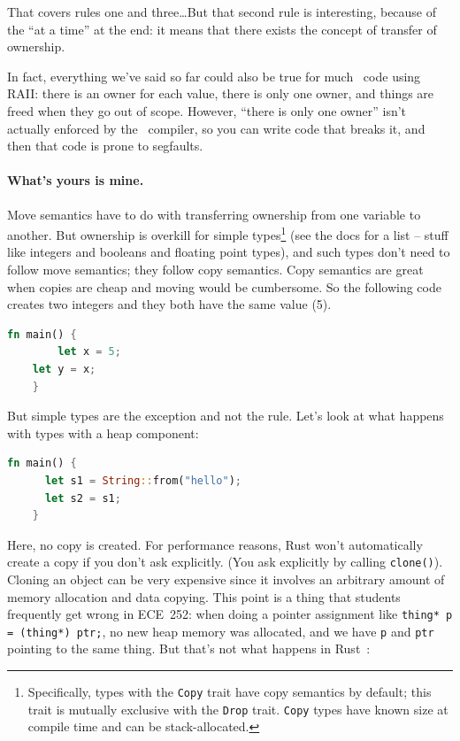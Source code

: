 That covers rules one and three\ldots But that second rule is interesting, because of the ``at a time'' at the end: it means that there exists the concept of transfer of ownership.

In fact, everything we've said so far could also be true for much \CPP~code using RAII: there is an owner for each value, there is only one owner, and things are freed when they go out of scope. However, ``there is only one owner'' isn't actually enforced by the \CPP~compiler, so you can write code that breaks it, and then that code is prone to segfaults. 

\paragraph{What's yours is mine.}
Move semantics have to do with transferring ownership from one variable to another. But ownership is overkill for simple types\footnote{Specifically, types with the \texttt{Copy} trait have copy semantics by default; this trait is mutually exclusive with the \texttt{Drop} trait. \texttt{Copy} types have known size at compile time and can be stack-allocated.} (see the docs for a list -- stuff like integers and booleans and floating point types), and such types don't need to follow move semantics; they follow copy semantics. Copy semantics are great when copies are cheap and moving would be cumbersome. So the following code creates two integers and they both have the same value (5).

\begin{lstlisting}[language=Rust]
    fn main() {
     	let x = 5;
  	let y = x;
    }
\end{lstlisting}

But simple types are the exception and not the rule. Let's look at what happens with types with a heap component:

\begin{lstlisting}[language=Rust]
    fn main() {
      let s1 = String::from("hello");
      let s2 = s1;
    }
\end{lstlisting}

Here, no copy is created. For performance reasons, Rust won't automatically create a copy if you don't ask explicitly. (You ask explicitly by calling \texttt{clone()}). Cloning an object can be very expensive since it involves an arbitrary amount of memory allocation and data copying. This point is a thing that students frequently get wrong in ECE~252: when doing a pointer assignment like \texttt{thing* p = (thing*) ptr;}, no new heap memory was allocated, and we have \texttt{p} and \texttt{ptr} pointing to the same thing. But that's not what happens in Rust~\cite{rustdocs}:

